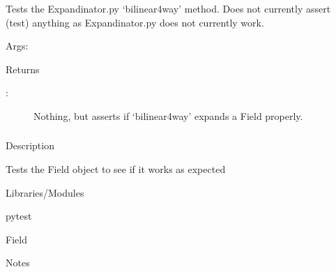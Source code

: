 \documentclass[letterpaper,10pt,english]{sphinxmanual}
\begin{document}
\begin{fulllineitems}
\label{\detokenize{autoapi/tests/test_Expandinator/index:tests.test_Expandinator.test_bilinear4way}}
\sphinxAtStartPar
Tests the Expandinator.py ‘bilinear4way’ method. Does not currently assert (test) anything
as Expandinator.py does not currently work.

\sphinxAtStartPar
Args:

\sphinxAtStartPar
Returns
\begin{description}
\item[{:}] \leavevmode
\sphinxAtStartPar
Nothing, but asserts if ‘bilinear4way’ expands a Field properly.

\end{description}

\end{fulllineitems}



\subsubsection{}
\label{\detokenize{autoapi/tests/test_Field/index:module-tests.test_Field}}\label{\detokenize{autoapi/tests/test_Field/index:tests-test-field}}\label{\detokenize{autoapi/tests/test_Field/index::doc}}
\sphinxAtStartPar
Description

\sphinxAtStartPar
Tests the Field object to see if it works as expected

\sphinxAtStartPar
Libraries/Modules

\sphinxAtStartPar
\sphinxhyphen{}pytest

\sphinxAtStartPar
\sphinxhyphen{}Field

\sphinxAtStartPar
Notes
\end{document}
